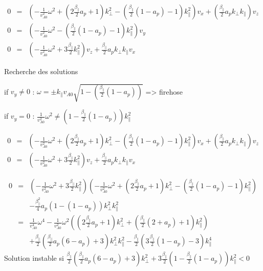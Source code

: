 \begin{eqnarray}
0 &=& ( - \frac{1 }{v^2_{A0}}\omega^2+(2\frac{\beta_{\parallel}}{2} a_p +1)k^2_{\perp} - (\frac{\beta_{\parallel}}{2}  (1 - a_p) -1) k^2_{\parallel}   )v_x + (\frac{\beta_{\parallel}}{2} a_p k_{\perp}k_{\parallel})v_z \nonumber\\
 0 &=& (- \frac{1 }{v^2_{A0}} \omega^2   - (\frac{\beta_{\parallel}}{2}  (1 - a_p) -1)k^2_{\parallel}  ) v_y   \nonumber\\
 0 &=& (- \frac{1 }{v^2_{A0}} \omega^2  + 3\frac{\beta_{\parallel}}{2} k^2_{\parallel}  ) v_z +\frac{\beta_{\parallel}}{2} a_p k_{\perp} k_{\parallel} v_x   \nonumber
\end{eqnarray}

Recherche des solutions

if $v_y \neq 0$ : $\omega = \pm k_{\parallel} v_{A0} \sqrt{1-(\frac{\beta_{\parallel}}{2} (1 - a_p) )} $ => firehose

if $v_y = 0$ : $\frac{1}{v^2_{A0}} \omega^2  \neq  (1- \frac{\beta_{\parallel}}{2} (1 - a_p) ) k^2_{\parallel} $

\begin{eqnarray}
0 &=& ( - \frac{1 }{v^2_{A0}}\omega^2+(2\frac{\beta_{\parallel}}{2} a_p +1)k^2_{\perp} - (\frac{\beta_{\parallel}}{2}  (1 - a_p) -1) k^2_{\parallel}   )v_x + (\frac{\beta_{\parallel}}{2} a_p k_{\perp}k_{\parallel})v_z \nonumber\\
 0 &=& (- \frac{1 }{v^2_{A0}} \omega^2  + 3\frac{\beta_{\parallel}}{2} k^2_{\parallel}  ) v_z +\frac{\beta_{\parallel}}{2}a_p k_{\perp} k_{\parallel} v_x   \nonumber
\end{eqnarray}

\begin{eqnarray}
0 &=& (- \frac{1 }{v^2_{A0}} \omega^2  + 3\frac{\beta_{\parallel}}{2} k^2_{\parallel}  ) ( - \frac{1 }{v^2_{A0}}\omega^2+(2\frac{\beta_{\parallel}}{2} a_p +1)k^2_{\perp} - (\frac{\beta_{\parallel}}{2}  (1 - a_p) -1) k^2_{\parallel}   ) \nonumber\\
&&- \frac{\beta^2_{\parallel}}{4} a_p (1 - (1 - a_p)) k^2_{\perp} k^2_{\parallel}  \nonumber\\
&=& \frac{1 }{v^4_{A0}} \omega^4 - \frac{1 }{v^2_{A0}} \omega^2 ((2\frac{\beta_{\parallel}}{2} a_p +1)k^2_{\perp} +(\frac{\beta_{\parallel}}{2} (2+a_p) +1) k^2_{\parallel} ) \nonumber\\
&&+\frac{\beta_{\parallel}}{2}(\frac{\beta_{\parallel}}{2}a_p (6  -  a_p)  +3) k^2_{\perp} k^2_{\parallel}  - \frac{\beta_{\parallel}}{2}(3\frac{\beta_{\parallel}}{2}  (1 - a_p) -3) k^4_{\parallel}  \nonumber 
\end{eqnarray}
Solution instable si $\frac{\beta_{\parallel}}{2}(\frac{\beta_{\parallel}}{2}a_p (6  -  a_p)  +3) k^2_{\perp}  + 3\frac{\beta_{\parallel}}{2}(1-\frac{\beta_{\parallel}}{2}  (1 - a_p) ) k^2_{\parallel}   <0$

